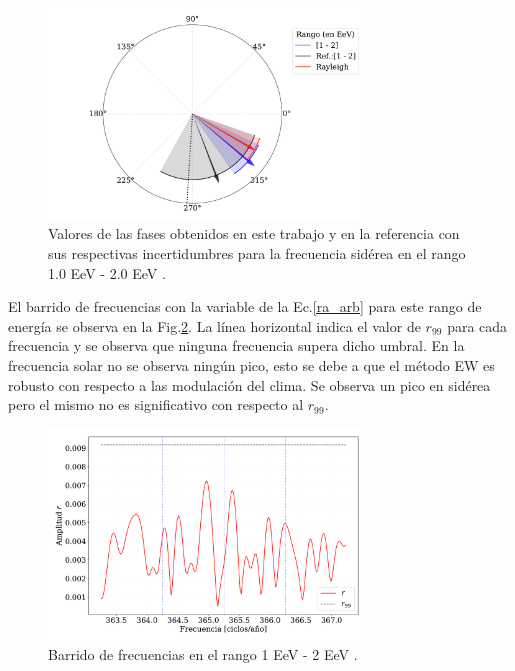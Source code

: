 \documentclass[11pt,papel,oneside,singlespace]{ibtesis}
\begin{document}
    \begin{figure}[H]
        \begin{small}
            \begin{center}
                \includegraphics[width=0.75\textwidth]{phase_tercer_bin.pdf}
            \end{center}
        \caption{Valores de las fases obtenidos en este trabajo y en la referencia con sus respectivas incertidumbres para la frecuencia sidérea en el  rango 1.0 EeV - 2.0 EeV .}
        \label{fig:tercer}
        \end{small}
    \end{figure}


    El barrido de frecuencias con la variable de la Ec.\ref{ra_arb} para este rango de energía se observa en la Fig.\ref{fig:tercer_barrido}. La línea horizontal indica el valor de $r_{99}$ para cada frecuencia y se observa que ninguna frecuencia supera dicho umbral. En la frecuencia solar no se observa ningún pico, esto se debe a que el método EW es robusto con respecto a las modulación del clima. Se observa un pico en sidérea pero el mismo no es significativo con respecto al $r_{99}$.


    \begin{figure}[H]
        \begin{small}
            \begin{center}
                \includegraphics[width=0.75\textwidth]{plot_bin_3_barrido_v2.pdf}
            \end{center}
            \caption{Barrido de frecuencias en el rango 1 EeV - 2 EeV .}
            \label{fig:tercer_barrido}
        \end{small}
    \end{figure}    
\end{document}

